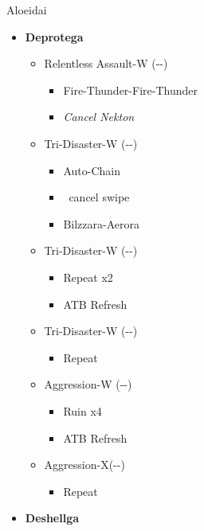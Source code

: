 \renewcommand{\first}{[1]Aggression-X(\com-\com-\nek)}
\renewcommand{\second}{[2] Aggression-W (\com-\com-\nek)}
\renewcommand{\third}{[3] Relentless Assault-W (\rav-\com-\nek)}
\renewcommand{\fourth}{[4] Patient Probing-W (\sen-\sen-\nek)}
\renewcommand{\fifth}{[5] Tri-Disaster-W (\rav-\rav-\nek)}
\renewcommand{\sixth}{[6] Tri-Disaster-W (\rav-\rav-\nek)}
\begin{battle}{Aloeidai}
\begin{flushleft}
\begin{itemize}
	\item \textbf{Deprotega}
	\begin{itemize}
		\item \third
		\begin{itemize}
			\item Fire-Thunder-Fire-Thunder
			\item \textit{Cancel Nekton}
		\end{itemize}
		\item \fifth
		\begin{itemize}
			\item Auto-Chain
			\item \stagger\ cancel swipe
			\item Bilzzara-Aerora
		\end{itemize}
		\item \sixth
		\begin{itemize}
			\item Repeat x2
			\item ATB Refresh
		\end{itemize}
		\item \fifth
		\begin{itemize}
			\item Repeat
		\end{itemize}
		\item \second
		\begin{itemize}
			\item Ruin x4
			\item ATB Refresh
		\end{itemize}
		\item \first
		\begin{itemize}
			\item Repeat
		\end{itemize}
	\end{itemize}
\end{itemize}
\begin{itemize}
	\item \textbf{Deshellga}

\end{itemize}
\end{flushleft}
\end{battle}
